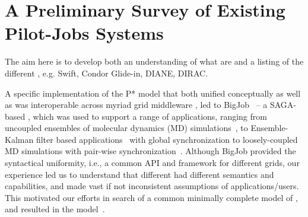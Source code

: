 \documentclass{sig-alternate}
\begin{document}

\section{A Preliminary Survey of Existing Pilot-Jobs Systems}
\label{sec:survey}

The aim here is to develop both an understanding of what \pilotjobs
are and a listing of the different \pilotjobs, e.g. Swift, Condor
Glide-in, DIANE, DIRAC.

    

A specific implementation of the P* model that both unified
conceptually as well as was interoperable across myriad grid
middleware , led to 
BigJob~\cite{saga_bigjob_condor_cloud} -- a
SAGA-based \pilotjob, which was used to support a range of
applications, ranging from uncoupled ensembles of molecular dynamics
(MD) simulations~\cite{saga_bigjob_condor_cloud}, to Ensemble-Kalman
filter based applications~\cite{gmac09} with global synchronization to
loosely-coupled MD simulations with pair-wise
synchronization~\cite{async_repex11}.  Although BigJob provided the
syntactical uniformity, i.e., a common API and framework for different
grids, our experience led us to understand that different \pilotjobs
had different semantics and capabilities, and made vast if not
inconsistent assumptions of applications/users. This motivated our
efforts in search of a common minimally complete model of \pilotjobs,
and resulted in the \pstar model~\cite{pstar12}. 
\end{document}
